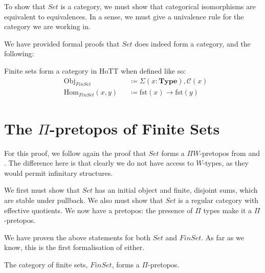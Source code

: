 To show that \(\mathit{Set}\) is a category, we must show that categorical
isomorphisms are equivalent to equivalences.
In a sense, we must give a univalence rule for the category we are working in.

We have provided formal proofs that \(\mathit{Set}\) does indeed form a
category, and the following:
\begin{theorem}
  Finite sets form a category in HoTT when defined like so:
  \begin{equation}
    \begin{alignedat}{3}
      &\text{Obj}_\mathit{FinSet}      &&\coloneqq \Sigma(x : \mathbf{Type}) , \mathcal{C}(x) \\
      &\text{Hom}_\mathit{FinSet}(x , y) &&\coloneqq  \text{fst}(x) \rightarrow \text{fst}(y)
    \end{alignedat}
  \end{equation}
\end{theorem}
\section{The \(\Pi\)-pretopos of Finite Sets}
For this proof, we follow again the proof that \(\mathit{Set}\) forms a \(\Pi
W\)-pretopos from \cite[chapter 10]{hottbook} and
\citep{rijkeSetsHomotopyType2015}.
The difference here is that clearly we do not have access to \(W\)-types, as
they would permit infinitary structures.

We first must show that \(\mathit{Set}\) has an initial object and finite,
disjoint sums, which are stable under pullback.
We also must show that \(\mathit{Set}\) is a regular category with effective
quotients.
We now have a pretopos: the presence of \(\Pi\) types make it a
\(\Pi\)-pretopos.

We have proven the above statements for both \(\mathit{Set}\) and
\(\mathit{FinSet}\).
As far as we know, this is the first formalisation of either.
\begin{theorem} \label{finite-topos}
  The category of finite sets, \(\mathit{FinSet}\), forms a \(\Pi\)-pretopos.
\end{theorem}


